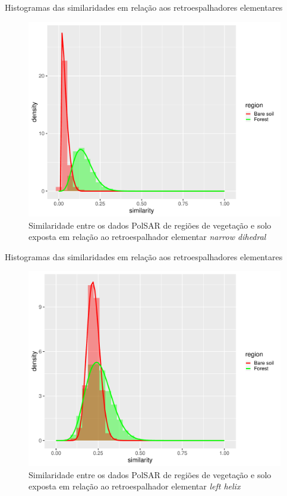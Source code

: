 \documentclass[10pt]{beamer}
\begin{document}
\begin{frame}{Histogramas das similaridades em relação aos retroespalhadores elementares}

\begin{figure}
    \centering
    \includegraphics[width = .6\linewidth]{nd.pdf}
    \caption{Similaridade entre os dados PolSAR de regiões de vegetação e solo exposta em relação ao retroespalhador elementar \textit{narrow dihedral}}
    \label{fig:nd}
\end{figure}
    
\end{frame}

\begin{frame}{Histogramas das similaridades em relação aos retroespalhadores elementares}

\begin{figure}
    \centering
    \includegraphics[width = .6\linewidth]{lh.pdf}
    \caption{Similaridade entre os dados PolSAR de regiões de vegetação e solo exposta em relação ao retroespalhador elementar \textit{left helix}}
    \label{fig:lh}
\end{figure}
    
\end{frame}
\end{document}
